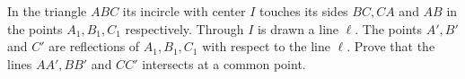 In the triangle $ABC$ its incircle with center $I$ touches its sides $BC, CA$ and $AB$ in the points $A_1, B_1, C_1$ respectively. Through $I$ is drawn a line $\ell$. The points $A', B'$ and $C'$ are reflections of $A_1, B_1, C_1$ with respect to the line $\ell$. Prove that the lines $AA', BB'$ and $CC'$ intersects at a common point.